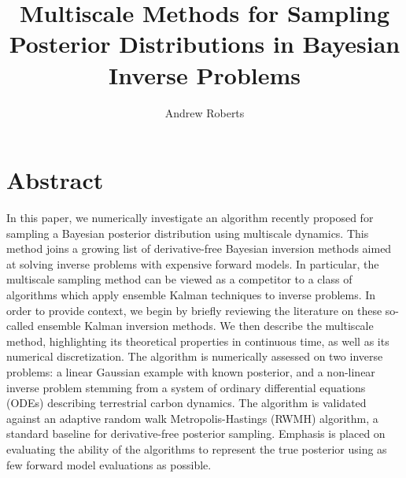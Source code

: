 \documentclass[12pt]{article}
\title{Multiscale Methods for Sampling Posterior Distributions in Bayesian Inverse Problems}
\author{Andrew Roberts}
\begin{document}
\maketitle
\newpage

\section{Abstract}
In this paper, we numerically investigate an algorithm recently proposed for sampling a Bayesian posterior distribution using 
multiscale dynamics. This method joins a growing list of derivative-free Bayesian inversion methods aimed at solving inverse 
problems with expensive forward models. In particular, the multiscale sampling method can be viewed as a competitor to 
a class of algorithms which apply ensemble Kalman techniques to inverse problems. In order to provide context, we begin by 
briefly reviewing the literature on these so-called ensemble Kalman inversion methods. We then describe the multiscale 
method, highlighting its theoretical properties in continuous time, as well as its numerical discretization. The algorithm is 
numerically assessed on two inverse problems: a linear Gaussian example with known posterior, and a non-linear inverse 
problem stemming from a system of ordinary differential equations (ODEs) describing terrestrial carbon dynamics. The algorithm 
is validated against an adaptive random walk Metropolis-Hastings (RWMH) algorithm, a standard baseline for derivative-free posterior 
sampling. Emphasis is placed on evaluating the ability of the algorithms to represent the true posterior using as few forward model 
evaluations as possible. 

\end{document}

